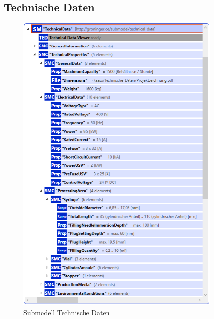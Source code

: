 \newpage
\subsection{Technische Daten}
\begin{figure}[H]
    \centering
    \includegraphics[width=0.9\textwidth]{Bilder/ErgebnissePackageExplorer/TehcnischeDaten.PNG}
    \caption{Submodell Technische Daten}
\end{figure}

\newpage
